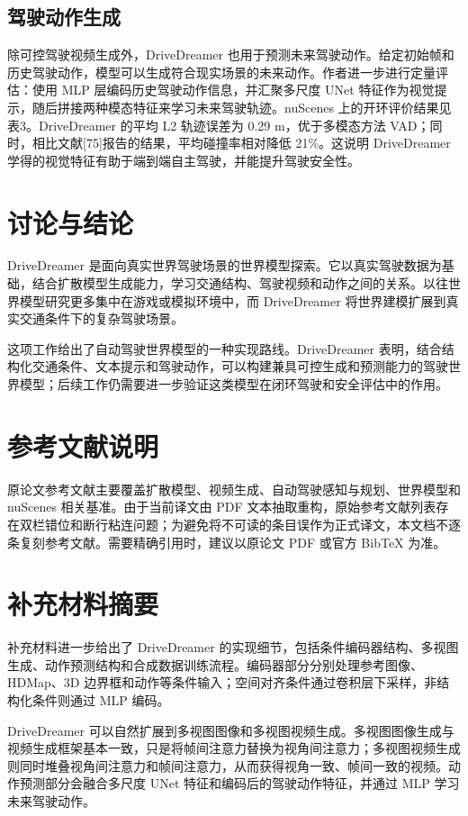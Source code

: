 \documentclass[10pt]{article}
\begin{document}
\subsection{驾驶动作生成}

除可控驾驶视频生成外，DriveDreamer 也用于预测未来驾驶动作。给定初始帧和历史驾驶动作，模型可以生成符合现实场景的未来动作。作者进一步进行定量评估：使用 MLP 层编码历史驾驶动作信息，并汇聚多尺度 UNet 特征作为视觉提示，随后拼接两种模态特征来学习未来驾驶轨迹。nuScenes 上的开环评价结果见表3。DriveDreamer 的平均 L2 轨迹误差为 0.29 m，优于多模态方法 VAD；同时，相比文献[75]报告的结果，平均碰撞率相对降低 21\%。这说明 DriveDreamer 学得的视觉特征有助于端到端自主驾驶，并能提升驾驶安全性。

\section{讨论与结论}

DriveDreamer 是面向真实世界驾驶场景的世界模型探索。它以真实驾驶数据为基础，结合扩散模型生成能力，学习交通结构、驾驶视频和动作之间的关系。以往世界模型研究更多集中在游戏或模拟环境中，而 DriveDreamer 将世界建模扩展到真实交通条件下的复杂驾驶场景。

这项工作给出了自动驾驶世界模型的一种实现路线。DriveDreamer 表明，结合结构化交通条件、文本提示和驾驶动作，可以构建兼具可控生成和预测能力的驾驶世界模型；后续工作仍需要进一步验证这类模型在闭环驾驶和安全评估中的作用。

\section*{参考文献说明}

原论文参考文献主要覆盖扩散模型、视频生成、自动驾驶感知与规划、世界模型和 nuScenes 相关基准。由于当前译文由 PDF 文本抽取重构，原始参考文献列表存在双栏错位和断行粘连问题；为避免将不可读的条目误作为正式译文，本文档不逐条复刻参考文献。需要精确引用时，建议以原论文 PDF 或官方 BibTeX 为准。


\section*{补充材料摘要}

补充材料进一步给出了 DriveDreamer 的实现细节，包括条件编码器结构、多视图生成、动作预测结构和合成数据训练流程。编码器部分分别处理参考图像、HDMap、3D 边界框和动作等条件输入；空间对齐条件通过卷积层下采样，非结构化条件则通过 MLP 编码。

DriveDreamer 可以自然扩展到多视图图像和多视图视频生成。多视图图像生成与视频生成框架基本一致，只是将帧间注意力替换为视角间注意力；多视图视频生成则同时堆叠视角间注意力和帧间注意力，从而获得视角一致、帧间一致的视频。动作预测部分会融合多尺度 UNet 特征和编码后的驾驶动作特征，并通过 MLP 学习未来驾驶动作。
\end{document}
